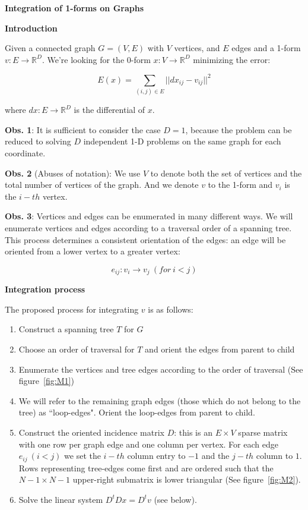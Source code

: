 \documentclass[a4paper,11pt]{article}
\begin{document}
\textbf{Integration of 1-forms on Graphs}

\bigskip

\textbf{Introduction}

\bigskip

Given a connected graph $G=(V,E)$ with $V$ vertices, and $E$ edges and a 
1-form $v: E \rightarrow \mathbb{R}^D$. We're looking for the 0-form 
$x: V \rightarrow \mathbb{R}^D$ minimizing the error:

$$E(x) = \sum_{(i,j) \in E} ||dx_{ij} - v_{ij}||^2$$

where $dx: E \rightarrow \mathbb{R}^D$ is the differential of $x$.

\bigskip

\textbf{Obs. 1}: It is sufficient to consider the case $D=1$, because 
the problem can be reduced to solving $D$ independent 1-D problems on 
the same graph for each coordinate.

\bigskip

\textbf{Obs. 2} (Abuses of notation): We use $V$ to denote both the set 
of vertices and the total number of vertices of the graph. And we denote 
$v$ to the 1-form and $v_i$ is the $i-th$ vertex.

\bigskip

\textbf{Obs. 3}: Vertices and edges can be enumerated in many different 
ways. We will enumerate vertices and edges according to a traversal 
order of a spanning tree. This process determines a consistent 
orientation of the edges: an edge will be oriented from a lower vertex 
to a greater vertex:

$$e_{ij}: v_i \rightarrow v_j \ (for \ i < j)$$

\bigskip

\textbf{Integration process}

\bigskip

The proposed process for integrating $v$ is as follows:

\begin{enumerate}
	\item Construct a spanning tree $T$ for $G$
	\item Choose an order of traversal for $T$ and orient the edges 
	from parent to child
	\item Enumerate the vertices and tree edges according to the order 
	of traversal (See figure~\ref{fig:M1})
	\item We will refer to the remaining graph edges (those which do not 
	belong to the tree) as ``loop-edges". Orient the loop-edges from 
	parent to child.
	\item Construct the oriented incidence matrix $D$: this is an $E \times V$ 
	sparse matrix with one row per graph edge and one column per vertex. 
	For each edge $e_{ij} \ (i < j)$ we set the $i-th$ column entry to $-1$ 
	and the $j-th$ column to $1$. Rows representing tree-edges come first 
	and are ordered such that the $N-1 \times N-1$ upper-right submatrix 
	is lower triangular (See figure~\ref{fig:M2}).
	\item Solve the linear system $D^tDx=D^tv$ (see below).
\end{enumerate}
\end{document}
